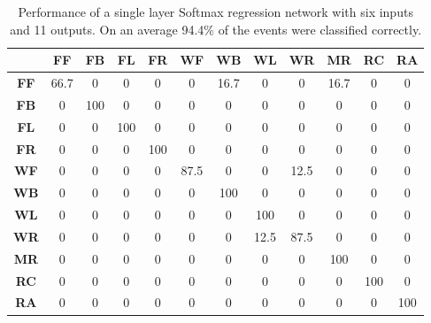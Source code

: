 \documentclass[]{IEEEtran}
\begin{document}
\begin{table}[htb]
\caption{Performance of a single layer Softmax regression network with six inputs and 11 outputs. On an average 94.4\% of the events were classified correctly.}
\label{tab:softmaxOnelayer}
\resizebox{\columnwidth}{!}
{
\begin{tabular}{|c|c|c|c|c|c|c|c|c|c|c|c|}
\hline 
& \textbf{FF} & \textbf{FB}  & \textbf{FL} & \textbf{FR} &  \textbf{WF} & 
\textbf{WB} & \textbf{WL} & \textbf{WR} & \textbf{MR} & 
\textbf{RC} & \textbf{RA} \\ \hline
\textbf{FF} & 66.7 &  0 &  0 &  0 &  0 &  16.7 &  0 &  0 &  16.7 &  0 &  0 \\ \hline
\textbf{FB} & 0 &  100 &  0 &  0 &  0 &  0 &  0 &  0 &  0 &  0 &  0 \\ \hline
\textbf{FL} & 0 &  0 &  100 &  0 &  0 &  0 &  0 &  0 &  0 &  0 &  0 \\ \hline
\textbf{FR} & 0 &  0 &  0 &  100 &  0 &  0 &  0 &  0 &  0 &  0 &  0 \\ \hline
\textbf{WF} & 0 &  0 &  0 &  0 &  87.5 &  0 &  0 &  12.5 &  0 &  0 &  0 \\ \hline
\textbf{WB} & 0 &  0 &  0 &  0 &  0 &  100 &  0 &  0 &  0 &  0 &  0 \\ \hline
\textbf{WL} & 0 &  0 &  0 &  0 &  0 &  0 &  100 &  0 &  0 &  0 &  0 \\ \hline
\textbf{WR} & 0 &  0 &  0 &  0 &  0 &  0 &  12.5 &  87.5 &  0 &  0 &  0 \\ \hline
\textbf{MR} & 0 &  0 &  0 &  0 &  0 &  0 &  0 &  0 &  100 &  0 &  0 \\ \hline
\textbf{RC} & 0 &  0 &  0 &  0 &  0 &  0 &  0 &  0 &  0 &  100 &  0 \\ \hline
\textbf{RA} & 0 &  0 &  0 &  0 &  0 &  0 &  0 &  0 &  0 &  0 &  100 \\ \hline
\end{tabular}
}
\end{table}
%
\end{document}

